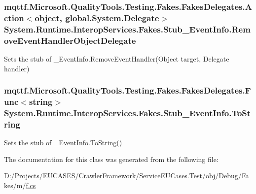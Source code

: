 \hypertarget{class_system_1_1_runtime_1_1_interop_services_1_1_fakes_1_1_stub___event_info_ab5cbc966ffa58d306139eb24d054e8d1}{
\subsubsection[{Remove\-Event\-Handler\-Object\-Delegate}]{\setlength{\rightskip}{0pt plus 5cm}mqttf.\-Microsoft.\-Quality\-Tools.\-Testing.\-Fakes.\-Fakes\-Delegates.\-Action$<$object, global.\-System.\-Delegate$>$ System.\-Runtime.\-Interop\-Services.\-Fakes.\-Stub\-\_\-\-Event\-Info.\-Remove\-Event\-Handler\-Object\-Delegate}}\label{class_system_1_1_runtime_1_1_interop_services_1_1_fakes_1_1_stub___event_info_ab5cbc966ffa58d306139eb24d054e8d1}


Sets the stub of \-\_\-\-Event\-Info.\-Remove\-Event\-Handler(\-Object target, Delegate handler)

\hypertarget{class_system_1_1_runtime_1_1_interop_services_1_1_fakes_1_1_stub___event_info_ad9775f774875fb093096538d180d3ec4}{
\subsubsection[{To\-String}]{\setlength{\rightskip}{0pt plus 5cm}mqttf.\-Microsoft.\-Quality\-Tools.\-Testing.\-Fakes.\-Fakes\-Delegates.\-Func$<$string$>$ System.\-Runtime.\-Interop\-Services.\-Fakes.\-Stub\-\_\-\-Event\-Info.\-To\-String}}\label{class_system_1_1_runtime_1_1_interop_services_1_1_fakes_1_1_stub___event_info_ad9775f774875fb093096538d180d3ec4}


Sets the stub of \-\_\-\-Event\-Info.\-To\-String()



The documentation for this class was generated from the following file\-:\begin{DoxyCompactItemize}
\item 
D\-:/\-Projects/\-E\-U\-C\-A\-S\-E\-S/\-Crawler\-Framework/\-Service\-E\-U\-Cases.\-Test/obj/\-Debug/\-Fakes/m/\hyperlink{m_2f_8cs}{f.\-cs}\end{DoxyCompactItemize}
